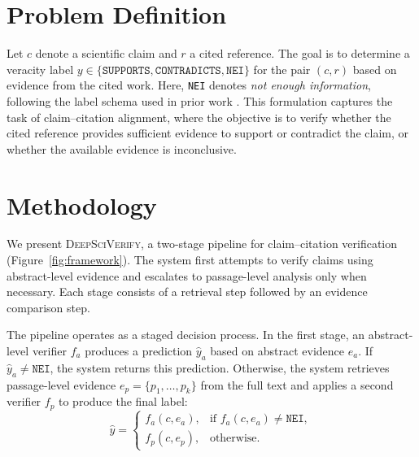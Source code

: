 \documentclass{article}
\theoremstyle{plain}
\theoremstyle{definition}
\theoremstyle{remark}
\begin{document}












\section{Problem Definition}
\label{sec:problem_definition}

Let $c$ denote a scientific claim and $r$ a cited reference. The goal is to determine a veracity label $y \in \{\texttt{SUPPORTS}, \texttt{CONTRADICTS}, \texttt{NEI}\}$ for the pair $(c, r)$ based on evidence from the cited work. Here, \texttt{NEI} denotes \textit{not enough information}, following the label schema used in prior work \cite{wadden2020fact, thorne2018fever}. This formulation captures the task of claim--citation alignment, where the objective is to verify whether the cited reference provides sufficient evidence to support or contradict the claim, or whether the available evidence is inconclusive.

\section{Methodology}
\label{sec:methodology}

We present \textsc{DeepSciVerify}, a two-stage pipeline for claim--citation verification (Figure~\ref{fig:framework}). The system first attempts to verify claims using abstract-level evidence and escalates to passage-level analysis only when necessary. Each stage consists of a retrieval step followed by an evidence comparison step.

The pipeline operates as a staged decision process. In the first stage, an abstract-level verifier $f_a$ produces a prediction $\hat{y}_a$ based on abstract evidence $e_a$. If $\hat{y}_a \neq \texttt{NEI}$, the system returns this prediction. Otherwise, the system retrieves passage-level evidence $e_p = \{p_1, \ldots, p_k\}$ from the full text and applies a second verifier $f_p$ to produce the final label:
\begin{equation}
\label{eq:verdict}
\hat{y} =
\begin{cases}
f_a(c, e_a), & \text{if } f_a(c, e_a) \neq \texttt{NEI}, \\[4pt]
f_p(c, e_p), & \text{otherwise.}
\end{cases}
\end{equation}
\end{document}
